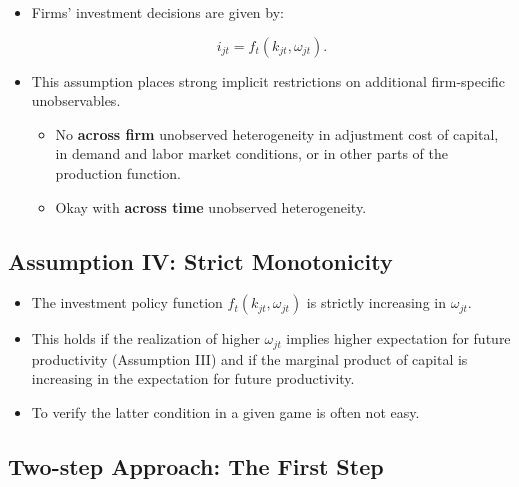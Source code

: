 \documentclass[]{book}
\providecommand{\tightlist}{%
  \setlength{\itemsep}{0pt}\setlength{\parskip}{0pt}}
\theoremstyle{definition}
\theoremstyle{definition}
\theoremstyle{definition}
\theoremstyle{remark}
\begin{document}
\begin{itemize}
\tightlist
\item
  Firms' investment decisions are given by:

  \begin{equation}
  i_{jt} = f_t(k_{jt}, \omega_{jt}).
  \end{equation}
\item
  This assumption places strong implicit restrictions on additional
  firm-specific unobservables.

  \begin{itemize}
  \tightlist
  \item
    No \textbf{across firm} unobserved heterogeneity in adjustment cost
    of capital, in demand and labor market conditions, or in other parts
    of the production function.
  \item
    Okay with \textbf{across time} unobserved heterogeneity.
  \end{itemize}
\end{itemize}

\subsection{Assumption IV: Strict
Monotonicity}\label{assumption-iv-strict-monotonicity}

\begin{itemize}
\tightlist
\item
  The investment policy function \(f_t(k_{jt}, \omega_{jt})\) is
  strictly increasing in \(\omega_{jt}\).
\item
  This holds if the realization of higher \(\omega_{jt}\) implies higher
  expectation for future productivity (Assumption III) and if the
  marginal product of capital is increasing in the expectation for
  future productivity.
\item
  To verify the latter condition in a given game is often not easy.
\end{itemize}

\subsection{Two-step Approach: The First
Step}\label{two-step-approach-the-first-step}
\end{document}
